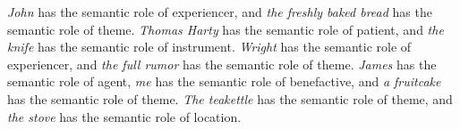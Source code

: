 \documentclass{article}
\begin{document}
\textit{John} has the semantic role of experiencer, and \textit{the freshly baked bread} has the semantic role of theme.
\textit{Thomas Harty} has the semantic role of patient, and \textit{the knife} has the semantic role of instrument.
\textit{Wright} has the semantic role of experiencer, and \textit{the full rumor} has the semantic role of theme.
\textit{James} has the semantic role of agent, \textit{me} has the semantic role of benefactive, and \textit{a fruitcake} has the semantic role of theme.
\textit{The teakettle} has the semantic role of theme, and \textit{the stove} has the semantic role of location.
\clearpage
\end{document}
